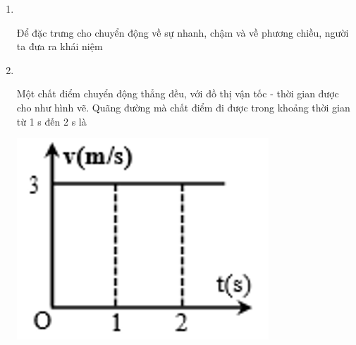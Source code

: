 \begin{enumerate}[label=\bfseries Câu \arabic*:]
{}

\item {}\\
{Để đặc trưng cho chuyển động về sự nhanh, chậm và về phương chiều, người ta đưa ra khái niệm
}

\item {}\\
{\begin{minipage}[l]{0.7\textwidth}
		Một chất điểm chuyển động thẳng đều, với đồ thị vận tốc - thời gian được cho như hình vẽ. Quãng đường mà chất điểm đi được trong khoảng thời gian từ 1 s đến 2 s là
	\end{minipage}
	\begin{minipage}{0.3\textwidth}
		\begin{center}
			\includegraphics[width=0.7\linewidth]{../figs/VN10-2022-PH-TP008-P-1}
		\end{center}
	\end{minipage}
}


\end{enumerate}
